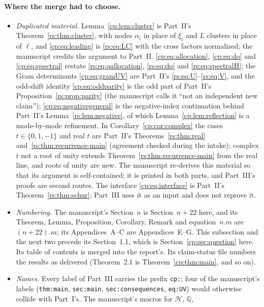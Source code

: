 \documentclass[11pt]{article}
\theoremstyle{definition}
\theoremstyle{remark}
\newcommand{\Q}{\mathbb Q}
\newcommand{\Ht}{\mathcal H}
\theoremstyle{definition}
\theoremstyle{plain}
\numberwithin{equation}{section}
\begin{document}
\paragraph{Where the merge had to choose.}
\begin{itemize}
\item \emph{Duplicated material.} Lemma~\ref{cp:lem:cluster} is Part~II's
Theorem~\ref{rs:thm:cluster}, with nodes $\alpha_i$ in place of $\xi_i$
and $L$ clusters in place of $\ell$, and \eqref{cp:eq:leading} is
\eqref{rs:eq:LC} with the cross factors normalized; the manuscript credits
the argument to Part~II.
\eqref{cp:eq:allocation}, \eqref{cp:eq:dq} and \eqref{cp:eq:spectral}
restate \eqref{rs:eq:qallocation}, \eqref{rs:eq:dq} and
\eqref{rs:eq:spectralH}; the Gram determinants \eqref{cp:eq:gramUV} are
Part~II's \eqref{rs:eq:U}--\eqref{rs:eq:V}, and the odd-shift identity
\eqref{cp:eq:oddparity} is the odd part of Part~II's
Proposition~\ref{rs:prop:parity} (the manuscript calls it ``not an
independent new claim''); \eqref{cp:eq:negativegeneral} is the
negative-index continuation behind Part~II's
Lemma~\ref{rs:lem:negative}, of which Lemma~\ref{cp:lem:reflection} is a
mode-by-mode refinement. In Corollary~\ref{cp:cor:complex} the cases
$t\in\{0,1,-1\}$ and real $t$ are Part~II's Theorems~\ref{rs:thm:real}
and~\ref{rs:thm:recurrence-main} (agreement checked during the intake);
complex $t$ not a root of unity extends Theorem~\ref{rs:thm:recurrence-main}
from the real line, and roots of unity are new. The manuscript re-derives
this material so that its argument is self-contained; it is printed in
both parts, and Part~III's proofs are second routes. The interface
\eqref{cp:eq:interface} is Part~II's Theorem~\ref{rs:thm:schur}; Part~III
uses it as an input and does not reprove it.
\item \emph{Numbering.} The manuscript's Section~$n$ is Section~$n+22$
here, and its Theorem, Lemma, Proposition, Corollary, Remark and
equation~$n.m$ are $(n+22).m$; its Appendices~A--C are
Appendices~E--G. This subsection and the next two precede its
Section~1.1, which is Section~\ref{cp:sec:question} here. Its table of
contents is merged into the report's. Its claim-status file numbers the
results as delivered (Theorem~2.1 is Theorem~\ref{cp:thm:main}, and so on).
\item \emph{Names.} Every label of Part~III carries the prefix
\texttt{cp:}; four of the manuscript's labels (\texttt{thm:main},
\texttt{sec:main}, \texttt{sec:consequences}, \texttt{eq:UV}) would
otherwise collide with Part~I's. The manuscript's macros for $\Ht$, $\Q$,

\end{itemize}
\end{document}
